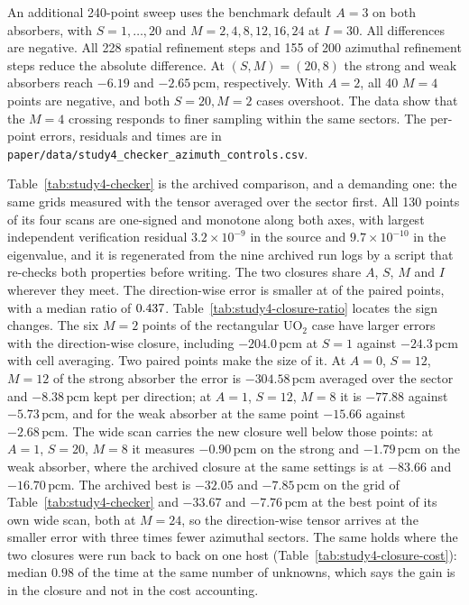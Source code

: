 \documentclass[11pt,a4paper]{article}
\newcommand{\pcm}{\,\mathrm{pcm}}
\begin{document}
An additional 240-point sweep uses the benchmark default $A{=}3$ on both absorbers,
with $S{=}1,\ldots,20$ and $M{=}2,4,8,12,16,24$ at $I{=}30$. All differences are
negative. All 228 spatial refinement steps and 155 of 200 azimuthal refinement
steps reduce the absolute difference. At $(S,M)=(20,8)$ the strong and weak
absorbers reach $-6.19$ and $-2.65\pcm$, respectively. With $A{=}2$, all 40
$M{=}4$ points are negative, and both $S{=}20,M{=}2$ cases overshoot. The data
show that the $M{=}4$ crossing responds to finer sampling within the same sectors.
The per-point errors, residuals and times are in
\texttt{paper/data/study4\_checker\_azimuth\_controls.csv}.




Table~\ref{tab:study4-checker} is the archived comparison, and a demanding one: the same
grids measured with the tensor averaged over the sector first. All 130 points of its
four scans are one-signed and monotone along both axes, with largest independent
verification residual $3.2\times10^{-9}$ in the source and $9.7\times10^{-10}$ in the
eigenvalue, and it is regenerated from the nine archived run logs by a script that
re-checks both properties before writing. The two closures share $A$, $S$, $M$ and $I$
wherever they meet. The direction-wise error is smaller at \StudyFourSmaller{} of the
\StudyFourPairs{} paired points, with a median ratio of $0.437$.
Table~\ref{tab:study4-closure-ratio} locates the \StudyFourSignChanges{} sign changes.
The six $M{=}2$ points of the rectangular UO$_2$ case have larger errors with the
direction-wise closure, including $-204.0\pcm$ at $S{=}1$ against $-24.3\pcm$ with cell averaging.
Two paired points make the size of it. At $A{=}0$,
$S{=}12$, $M{=}12$ of the strong absorber the error is $-304.58\pcm$ averaged over the
sector and $-8.38\pcm$ kept per direction; at $A{=}1$, $S{=}12$, $M{=}8$ it is
$-77.88$ against $-5.73\pcm$, and for the weak absorber at the same point $-15.66$
against $-2.68\pcm$. The wide scan carries the new closure well below those points: at
$A{=}1$, $S{=}20$, $M{=}8$ it measures $-0.90\pcm$ on the strong and $-1.79\pcm$ on the
weak absorber, where the archived closure at the same settings is at $-83.66$ and
$-16.70\pcm$. The archived best is $-32.05$ and $-7.85\pcm$ on the grid of
Table~\ref{tab:study4-checker} and $-33.67$ and $-7.76\pcm$ at the best point of its own
wide scan, both at $M{=}24$, so the direction-wise tensor arrives at the smaller error
with three times fewer azimuthal sectors. The same holds where the two closures were run back to back on one host
(Table~\ref{tab:study4-closure-cost}): median $0.98$ of the time at the same number of
unknowns, which says the gain is in the closure and not in the cost accounting.
\end{document}
